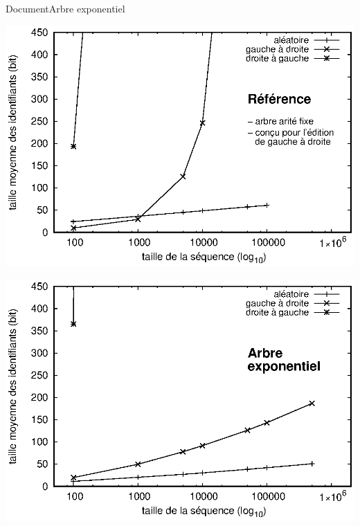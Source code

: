 \begin{frame}{Document}{Arbre exponentiel}
  \vspace{0.5cm}\hspace{-1cm}
  \begin{minipage}{0.45\textwidth}
    \includegraphics[width=1.25\textwidth]{img/replication/logoot.eps}
  \end{minipage}
  \hspace{1.5cm}
  \begin{minipage}{0.45\textwidth}
    \includegraphics[width=1.25\textwidth]{img/replication/double.eps}
  \end{minipage}


    

\end{frame}


